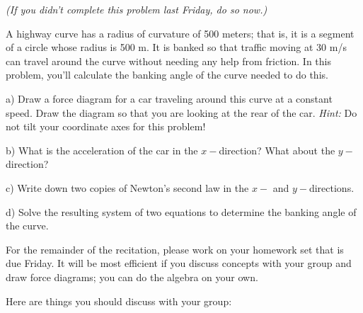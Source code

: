 \documentclass[12pt]{article}
\begin{document}
\Large
\centerline{}
\normalsize
\centerline{}


\it (If you didn't complete this problem last Friday, do so now.) \rm 

A highway curve has a radius of curvature of 500 meters; that is, it is a segment of a circle whose radius is 500 m. It is banked so that traffic moving at 30 m/s can travel
around the curve without needing any help from friction. In this problem, you'll calculate the banking angle of the curve needed to do this.

\bigskip




a) Draw a force diagram for a car traveling around this curve at a constant speed. Draw the diagram so that you are looking at the rear of the car. {\it Hint:} Do not tilt your coordinate axes for this problem!
\vspace{2.5in}

b) What is the acceleration of the car in the $x-$direction? What about the $y-$direction?

\vspace{2.5in}



c) Write down two copies of Newton's second law in the $x-$ and $y-$directions.
\vspace{2.5in}

d) Solve the resulting system of two equations to determine the banking angle of the curve.


\newpage\rm

For the remainder of the recitation, please work on your homework set that is due Friday. It will be most efficient if you discuss concepts with your group and draw force diagrams; you can do the algebra on your own.

Here are things you should discuss with your group:
\end{document}
